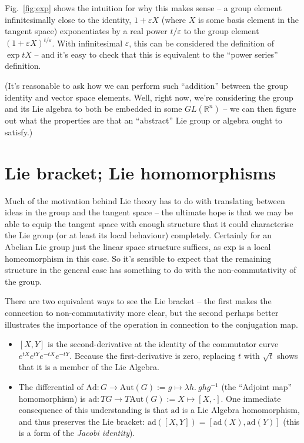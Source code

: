 \documentclass{article}
\newcommand{\Aut}{\mathrm{Aut}}
\newcommand{\Ad}{\mathrm{Ad}}
\newcommand{\ad}{\mathrm{ad}}
\newcommand{\Real}{\mathbb{R}}
\begin{document}
Fig.~\ref{fig:exp} shows the intuition for why this makes sense -- a group element infinitesimally close to the identity, $1+\varepsilon X$ (where $X$ is some basis element in the tangent space) exponentiates by a real power $t/\varepsilon$ to the group element $(1+\varepsilon X)^{t/\varepsilon}$. With infinitesimal $\varepsilon$, this can be considered the definition of $\exp{tX}$ -- and it's easy to check that this is equivalent to the ``power series'' definition.

(It's reasonable to ask how we can perform such ``addition'' between the group identity and vector space elements. Well, right now, we're considering the group and its Lie algebra to both be embedded in some $GL(\Real^n)$ -- we can then figure out what the properties are that an ``abstract'' Lie group or algebra ought to satisfy.)

\section{Lie bracket; Lie homomorphisms}

Much of the motivation behind Lie theory has to do with translating between ideas in the group and the tangent space -- the ultimate hope is that we may be able to equip the tangent space with enough structure that it could characterise the Lie group (or at least its local behaviour) completely. Certainly for an Abelian Lie group just the linear space structure suffices, as $\mathrm{exp}$ is a local homeomorphism in this case. So it's sensible to expect that the remaining structure in the general case has something to do with the non-commutativity of the group.

There are two equivalent ways to see the Lie bracket -- the first makes the connection to non-commutativity more clear, but the second perhaps better illustrates the importance of the operation in connection to the conjugation map.
\begin{itemize}
    \item $[X,Y]$ is the second-derivative at the identity of the commutator curve $e^{tX}e^{tY}e^{-tX}e^{-tY}$. Because the first-derivative is zero, replacing $t$ with $\sqrt{t}$ shows that it is a member of the Lie Algebra.
    \item The differential of $\Ad:G\to\Aut(G):=g\mapsto \lambda h.\ ghg^{-1}$ (the ``Adjoint map'' homomorphism) is $\ad:TG\to T\Aut(G):= X \mapsto [X,\cdot]$. One immediate consequence of this understanding is that $\ad$ is a Lie Algebra homomorphism, and thus preserves the Lie bracket: $\ad([X,Y])=[\ad(X), \ad(Y)]$ (this is a form of the \emph{Jacobi identity}).
\end{itemize}
\end{document}
